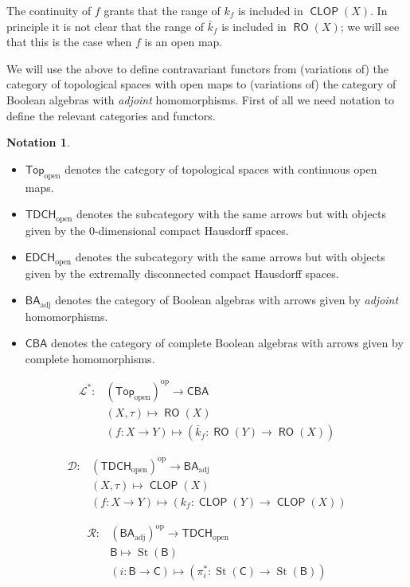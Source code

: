 \documentclass[11pt]{amsart}
\theoremstyle{plain}
\theoremstyle{definition}
\newtheorem{notation}[theorem]{Notation}
\theoremstyle{plain}
\theoremstyle{remark}
\DeclareMathOperator{\St}{St}
\DeclareMathOperator{\RO}{\mathsf{RO}}
\DeclareMathOperator{\CLOP}{\mathsf{CLOP}}
\newcommand{\bool}[1]{\mathsf{#1}}
\newcommand{\0}{\mathsf{0}}
\renewcommand{\1}{\mathsf{1}}
\renewcommand{\2}{\mathsf{2}}
\theoremstyle{definition}
\begin{document}
The continuity of $f$ grants  that the range of $k_f$ is included in $\CLOP(X)$. 
In principle it is not clear that the range of $\bar{k}_f$ is included in $\RO(X)$; we will see that this is the case when $f$ is an open map.

We will use the above to define contravariant functors from (variations of) the category of topological spaces with open maps to (variations of) the category of Boolean algebras with \emph{adjoint} homomorphisms.
First of all we need notation to define the relevant categories and functors.
\begin{notation}
\emph{}

\begin{itemize}
\item $\bool{Top}_{\mathrm{open}}$ denotes the category of topological spaces with continuous open maps.
\item $\bool{TDCH}_{\mathrm{open}}$ denotes the subcategory with the same arrows but with objects given by the $0$-dimensional compact Hausdorff spaces.
\item $\bool{EDCH}_{\mathrm{open}}$ denotes
the subcategory with the same arrows but with objects given by the extremally disconnected compact Hausdorff spaces.
\item $\bool{BA}_{\mathrm{adj}}$ denotes the category of Boolean algebras with arrows given by \emph{adjoint} homomorphisms.
\item $\bool{CBA}$ denotes the category of complete Boolean algebras with arrows given by complete homomorphisms.
\end{itemize}

\begin{align*}
\mathcal{L}^*: & (\bool{Top}_{\mathrm{open}})^\mathrm{op}\to \bool{CBA}\\
& (X,\tau)\mapsto \RO(X)\\
& (f:X\to Y) \mapsto (\bar{k}_f:\RO(Y)\to\RO(X))
\end{align*}


\begin{align*}
\mathcal{D}: & (\bool{TDCH}_{\mathrm{open}})^\mathrm{op}\to \bool{BA}_{\mathrm{adj}}\\
& (X,\tau)\mapsto \CLOP(X)\\
& (f:X\to Y) \mapsto (k_f:\CLOP(Y)\to\CLOP(X))
\end{align*}

\begin{align*}
\mathcal{R}: & (\bool{BA}_{\mathrm{adj}})^\mathrm{op} \to \bool{TDCH}_{\mathrm{open}}\\
& \bool{B} \mapsto \St(\bool{B})\\
& (i:\bool{B}\to \bool{C}) \mapsto (\pi^*_i:\St(\bool{C})\to\St(\bool{B}))
\end{align*}

\end{notation}
\end{document}
